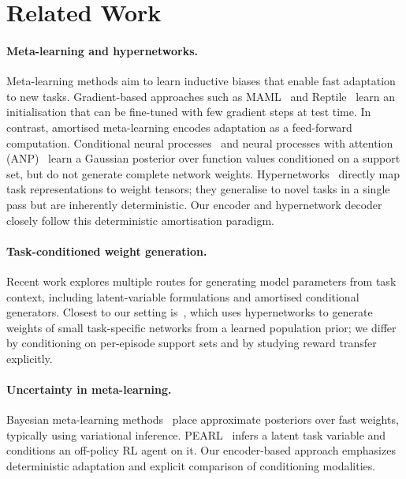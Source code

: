 \section{Related Work}\label{sec:related}

\paragraph{Meta-learning and hypernetworks.}
Meta-learning methods aim to learn inductive biases that enable fast adaptation to new tasks.
Gradient-based approaches such as MAML~\cite{finn2017model} and Reptile~\cite{nichol2018reptile} learn an initialisation that can be fine-tuned with few gradient steps at test time.
In contrast, amortised meta-learning encodes adaptation as a feed-forward computation.
Conditional neural processes~\cite{garnelo2018conditional} and neural processes with attention (ANP)~\cite{kim2019attentive} learn a Gaussian posterior over function values conditioned on a support set, but do not generate complete network weights.
Hypernetworks~\cite{ha2016hypernetworks} directly map task representations to weight tensors; they generalise to novel tasks in a single pass but are inherently deterministic.
Our encoder and hypernetwork decoder closely follow this deterministic amortisation paradigm.

\paragraph{Task-conditioned weight generation.}
Recent work explores multiple routes for generating model parameters from task context, including latent-variable formulations and amortised conditional generators.
Closest to our setting is~\cite{schurholt2022hyper}, which uses hypernetworks to generate weights of small task-specific networks from a learned population prior; we differ by conditioning on per-episode support sets and by studying reward transfer explicitly.

\paragraph{Uncertainty in meta-learning.}
Bayesian meta-learning methods~\cite{gordon2019meta,rusu2019meta} place approximate posteriors over fast weights, typically using variational inference.
PEARL~\cite{rakelly2019efficient} infers a latent task variable and conditions an off-policy RL agent on it.
Our encoder-based approach emphasizes deterministic adaptation and explicit comparison of conditioning modalities.

